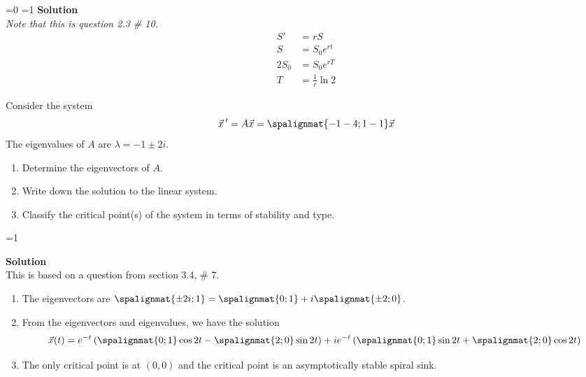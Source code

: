 \documentclass[12pt]{exam}
\newcommand{\sol}{1} %
\begin{document}
\begin{questions}
    
    
    \ifnum \sol=0 
    {
    \vspace{4cm}
    }
    \fi    
    \ifnum \sol=1
        {\color{DarkBlue} \textbf{Solution}\\ 
        \textit{Note that this is question 2.3 \# 10. }
        \begin{align*}
            S' &= r S \\ 
            S &= S_0e^{rt} \\
            2S_0 &= S_0e^{rT} \\
            T &= \frac 1r \ln 2
        \end{align*}
    }
    \fi


    
        
    
    \question[4] Consider the system $$ \vec x \, ' = A \vec x = \spalignmat{-1 -4;1 -1} \vec x$$ The eigenvalues of $A$ are $\lambda = -1 \pm 2i$. 
    \begin{enumerate}[label=(\alph*)]
        \item Determine the eigenvectors of $A$. 
        \item Write down the solution to the linear system. 
        \item Classify the critical point(s) of the system in terms of stability and type.
    \end{enumerate}
    
    \ifnum \sol=1
        {\color{DarkBlue} \textbf{Solution}\\ This is based on a question from section 3.4, \# 7. 
    \begin{enumerate}[label=(\alph*)]
        \item The eigenvectors are $\spalignmat{\pm2i;1}=\spalignmat{0;1}+ i\spalignmat{\pm2;0}$.
        \item From the eigenvectors and eigenvalues, we have the solution $$\vec x (t) = e^{-t} \left( \spalignmat{0;1}\cos2t - \spalignmat{2;0 } \sin2t\right) + i e^{-t}\left( \spalignmat{0;1}\sin2t + \spalignmat{2;0 }\cos2t \right)$$
        \item The only critical point is at $(0,0)$ and the critical point is an asymptotically stable spiral sink.
    \end{enumerate}
    
}
\end{questions}
\end{document}
